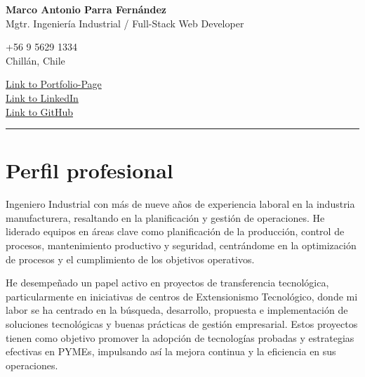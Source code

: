 \documentclass[a4paper,10pt]{article}
\newcommand{\mediumfont}{\fontsize{12pt}{14pt}\selectfont}
\begin{document}
	
	\pagestyle{fancy}
	
	
	
	\begin{center}
		\textbf{\LARGE Marco Antonio Parra Fernández} \\
		{\mediumfont Mgtr. Ingeniería Industrial / Full-Stack Web Developer} \\
		
		\begin{minipage}[t]{0.45\textwidth}
			\small +56 9 5629 1334 \\
			\small Chillán, Chile \\
		\end{minipage}%
		\hfill
		\begin{minipage}[t]{0.45\textwidth}
			\raggedleft
			\small \href{https://portfolio-mparraf.herokuapp.com}{Link to Portfolio-Page} \\
			\small \href{https://www.linkedin.com/in/marco-antonio-parra-82999337/}{Link to LinkedIn} \\
			\small \href{https://www.github.com/maaferna}{Link to GitHub}
		\end{minipage}
		\vspace{10pt} %
		\hrule
		\vspace{10pt} %
		
	\end{center}
	
	\section*{Perfil profesional}
	\small
Ingeniero Industrial con más de nueve años de experiencia laboral en la industria manufacturera, resaltando en la planificación y gestión de operaciones. He liderado equipos en áreas clave como planificación de la producción, control de procesos,  mantenimiento productivo y seguridad, centrándome en la optimización de procesos y el cumplimiento de los objetivos operativos.

He desempeñado un papel activo en proyectos de transferencia tecnológica, particularmente en iniciativas de centros de Extensionismo Tecnológico, donde mi labor se ha centrado en la búsqueda, desarrollo, propuesta e implementación de soluciones tecnológicas y buenas prácticas de gestión empresarial. Estos proyectos tienen como objetivo promover la adopción de tecnologías probadas y estrategias efectivas en PYMEs, impulsando así la mejora continua y la eficiencia en sus operaciones.
\end{document}
